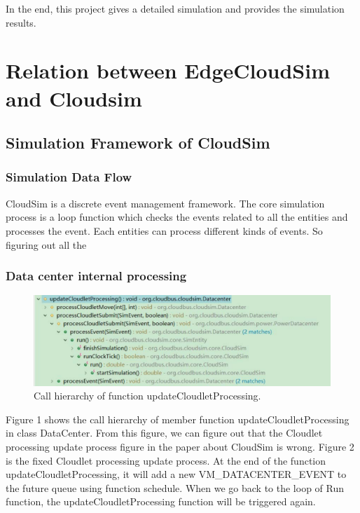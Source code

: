 In the end, this project gives a detailed simulation and provides the simulation results.


\section{Relation between EdgeCloudSim and Cloudsim}

\subsection{Simulation Framework of CloudSim}
\subsubsection{Simulation Data Flow}
CloudSim is a discrete event management framework. The core simulation process is a loop function which checks the events related to all the entities and processes the event. Each entities can process different kinds of events. So figuring out all the 

\subsubsection{Data center internal processing}
\begin{figure}
	\centering
	\includegraphics[width=1\textwidth]{./figures/2-updateCloudletProcessing.pdf}
	\caption{\label{fig:cloudletProcessing}Call hierarchy of function updateCloudletProcessing.}
\end{figure}

Figure 1 shows the call hierarchy of member function updateCloudletProcessing in class DataCenter. From this figure, we can figure out that the Cloudlet processing update process figure in the paper about CloudSim is wrong. Figure 2 is the fixed Cloudlet processing update process. At the end of the function updateCloudletProcessing, it will add a new VM\_DATACENTER\_EVENT to the future queue using function schedule. When we go back to the loop of Run function, the updateCloudletProcessing function will be triggered again.

